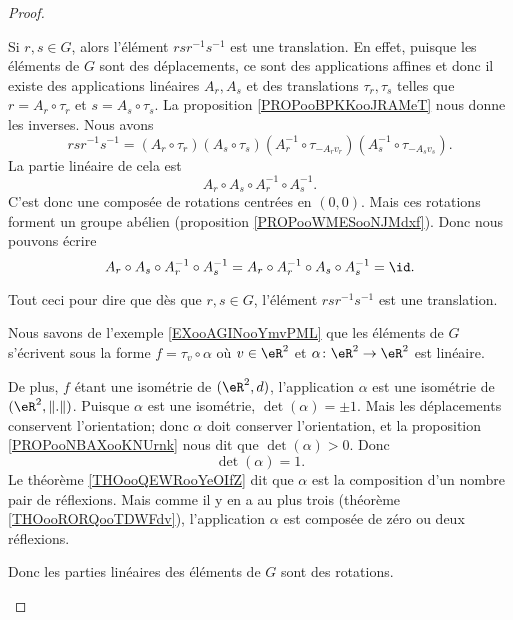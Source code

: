 \begin{proof}
\begin{subproof}
		\spitem[Translation]
		Si \( r,s\in G\), alors l'élément \( rsr^{-1}s^{-1}\) est une translation. En effet, puisque les éléments de \( G\) sont des déplacements, ce sont des applications affines et donc il existe des applications linéaires \( A_r,A_s\) et des translations \( \tau_r,\tau_s\) telles que \( r=A_r\circ \tau_r\) et \( s=A_s\circ \tau_s\). La proposition \ref{PROPooBPKKooJRAMeT} nous donne les inverses. Nous avons
		\begin{equation}
			rsr^{-1}s^{-1}=(A_r\circ \tau_r)(A_s\circ \tau_s)(A_r^{-1}\circ \tau_{-A_rv_r})(A_s^{-1}\circ \tau_{-A_sv_s}).
		\end{equation}
		La partie linéaire de cela est
		\begin{equation}
			A_r\circ A_s\circ A_r^{-1}\circ A_s^{-1}.
		\end{equation}
		C'est donc une composée de rotations centrées en \( (0,0)\). Mais ces rotations forment un groupe abélien (proposition \ref{PROPooWMESooNJMdxf}). Donc nous pouvons écrire
		\begin{equation}
			A_r\circ A_s\circ A_r^{-1}\circ A_s^{-1}=A_r\circ A_r^{-1}\circ A_s\circ A_s^{-1}=\id.
		\end{equation}

		Tout ceci pour dire que dès que \( r,s\in G\), l'élément \( rsr^{-1} s^{-1}\) est une translation.

		Nous savons de l'exemple \ref{EXooAGINooYmvPML} que les éléments de \( G\) s'écrivent sous la forme \( f=\tau_v\circ \alpha\) où \( v\in \eR^2\) et \( \alpha\colon \eR^2\to \eR^2\) est linéaire.

		De plus, \( f\) étant une isométrie de \( (\eR^2,d)\), l'application \( \alpha\) est une isométrie de \( (\eR^2,\| . \|)\). Puisque \( \alpha\) est une isométrie, \( \det(\alpha)=\pm1\). Mais les déplacements conservent l'orientation; donc \( \alpha\) doit conserver l'orientation, et la proposition \ref{PROPooNBAXooKNUrnk} nous dit que \( \det(\alpha)>0\). Donc
		\begin{equation}
			\det(\alpha)=1.
		\end{equation}
		Le théorème \ref{THOooQEWRooYeOIfZ} dit que \( \alpha\) est la composition d'un nombre pair de réflexions. Mais comme il y en a au plus trois (théorème \ref{THOooRORQooTDWFdv}), l'application \( \alpha\) est composée de zéro ou deux réflexions.

		Donc les parties linéaires des éléments de \( G\) sont des rotations.


\end{subproof}
\end{proof}
